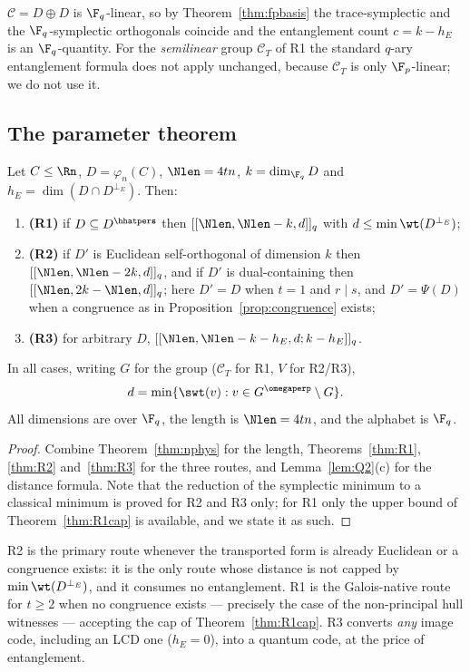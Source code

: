 \begin{remark}
$\mathcal C=D\oplus D$ is $\F_q$-linear, so by
Theorem~\ref{thm:fpbasis} the trace-symplectic and the $\F_q$-symplectic
orthogonals coincide and the entanglement count $c=k-h_E$ is an $\F_q$-quantity.
For the \emph{semilinear} group $\mathcal C_T$ of R1 the standard $q$-ary
entanglement formula does not apply unchanged, because $\mathcal C_T$ is only
$\F_p$-linear; we do not use it.
\end{remark}

\subsection{The parameter theorem}

\begin{theorem}[parameters]\label{thm:parameters}
Let $C\le\Rn$, $D=\varphi_n(C)$, $\Nlen=4tn$, $k=\dim_{\F_q}D$ and
$h_E=\dim(D\cap D^{\perp_E})$. Then:
\begin{enumerate}[label=\textnormal{(\alph*)},leftmargin=*]
\item \textbf{(R1)} if $D\subseteq D^{\hhatpers}$ then $[[\Nlen,\Nlen-k,d]]_q$
  with $d\le\min\wt(D^{\perp_E})$;
\item \textbf{(R2)} if $D'$ is Euclidean self-orthogonal of dimension $k$ then
  $[[\Nlen,\Nlen-2k,d]]_q$, and if $D'$ is dual-containing then
  $[[\Nlen,2k-\Nlen,d]]_q$; here $D'=D$ when $t=1$ and $r\mid s$, and
  $D'=\Psi(D)$ when a congruence as in Proposition~\ref{prop:congruence}
  exists;
\item \textbf{(R3)} for arbitrary $D$,
  $[[\Nlen,\Nlen-k-h_E,d;k-h_E]]_q$.
\end{enumerate}
In all cases, writing $G$ for the group ($\mathcal C_T$ for R1, $V$ for R2/R3),
\[
  d=\min\{\swt(v):v\in G^{\omegaperp}\setminus G\}.
\]
All dimensions are over $\F_q$, the length is $\Nlen=4tn$, and the alphabet is
$\F_q$.
\end{theorem}

\begin{proof}
Combine Theorem~\ref{thm:nphys} for the length, Theorems~\ref{thm:R1},
\ref{thm:R2} and~\ref{thm:R3} for the three routes, and
Lemma~\ref{lem:Q2}(c) for the distance formula. Note that the reduction of the
symplectic minimum to a classical minimum is proved for R2 and R3 only; for R1
only the upper bound of Theorem~\ref{thm:R1cap} is available, and we state it as
such.
\end{proof}

\begin{remark}
R2 is the primary route whenever the transported form is already Euclidean or a
congruence exists: it is the only route whose distance is not capped by
$\min\wt(D^{\perp_E})$, and it consumes no entanglement. R1 is the
Galois-native route for $t\ge2$ when no congruence exists --- precisely the case
of the non-principal hull witnesses --- accepting the cap of
Theorem~\ref{thm:R1cap}. R3 converts \emph{any} image code, including an LCD one
($h_E=0$), into a quantum code, at the price of entanglement.
\end{remark}

